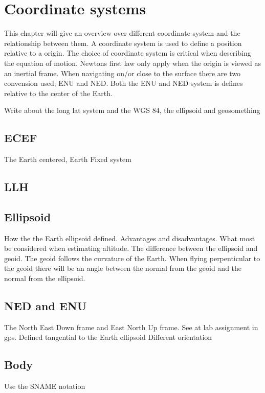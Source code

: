 
\chapter{Coordinate systems}
This chapter will give an overview over different coordinate system and the relationship between them. A coordinate system is used to define a position relative to a origin. The choice of coordinate system is critical when describing the equation of motion. Newtons first law only apply when the origin is viewed as an inertial frame. When navigating on/or close to the surface there are two convension used; ENU and NED. Both the ENU and NED system is defines relative to the center of the Earth.

Write about the long lat system and the WGS 84, the ellipsoid and geosomething
\section{ECEF}
The Earth centered, Earth Fixed system

\section{LLH}
\section{Ellipsoid}
How the the Earth ellipsoid defined. Advantages and disadvantages. What most be considered when estimating altitude. The difference between the ellipsoid and geoid. The geoid follows the curvature of the Earth. When flying perpenticular to the geoid there will be an angle between the normal from the geoid and the normal from the ellipsoid. 
\section{NED and ENU}
The North East Down frame and East North Up frame. See at lab assignment in gps.
Defined tangential to the Earth ellipsoid
Different orientation
\section{Body}
Use the SNAME notation
\cleardoublepage